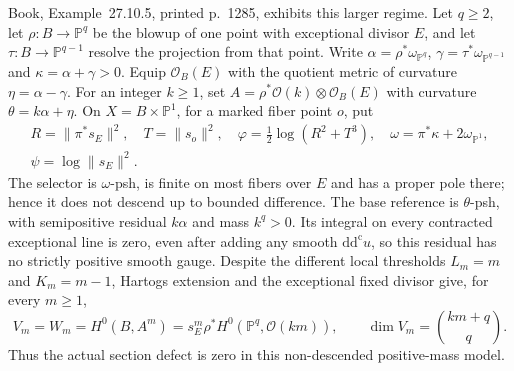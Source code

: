 \documentclass[11pt]{article}
\begin{document}
Book, Example~27.10.5, printed p.~1285, exhibits this larger regime. Let $q\geq2$, let $\rho:B\to\mathbb P^q$ be the blowup of one point with exceptional divisor $E$, and let $\tau:B\to\mathbb P^{q-1}$ resolve the projection from that point. Write $\alpha=\rho^*\omega_{\mathbb P^q}$, $\gamma=\tau^*\omega_{\mathbb P^{q-1}}$ and $\kappa=\alpha+\gamma>0$. Equip $\mathcal O_B(E)$ with the quotient metric of curvature $\eta=\alpha-\gamma$. For an integer $k\geq1$, set $A=\rho^*\mathcal O(k)\otimes\mathcal O_B(E)$ with curvature $\theta=k\alpha+\eta$. On $X=B\times\mathbb P^1$, for a marked fiber point $o$, put
\[
 \begin{gathered}
 R=\|\pi^*s_E\|^2,\quad T=\|s_o\|^2,\quad
 \varphi=\tfrac12\log(R^2+T^3),\quad
 \omega=\pi^*\kappa+2\omega_{\mathbb P^1},\\
 \psi=\log\|s_E\|^2.
 \end{gathered}
\]
The selector is $\omega$-psh, is finite on most fibers over $E$ and has a proper pole there; hence it does not descend up to bounded difference. The base reference is $\theta$-psh, with semipositive residual $k\alpha$ and mass $k^q>0$. Its integral on every contracted exceptional line is zero, even after adding any smooth $\mathrm{dd}^{\mathrm c}u$, so this residual has no strictly positive smooth gauge. Despite the different local thresholds $L_m=m$ and $K_m=m-1$, Hartogs extension and the exceptional fixed divisor give, for every $m\geq1$,
\[
 V_m=W_m=H^0(B,A^m)=s_E^m\rho^*H^0(\mathbb P^q,\mathcal O(km)),
 \qquad \dim V_m=\binom{km+q}{q}.
\]
Thus the actual section defect is zero in this non-descended positive-mass model.
\end{document}
